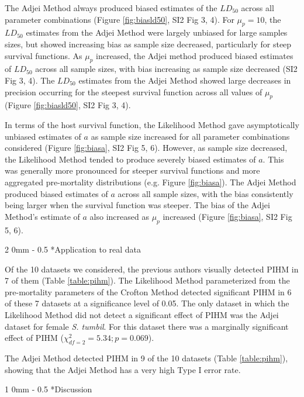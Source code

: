 \documentclass[12pt, a4paper]{article}
\makeatletter
\renewcommand{\section}{\@startsection
{section}%
{1}%
{0mm}%
{-\baselineskip}%
{0.5\baselineskip}%
{\normalfont\bf\large}} %
\renewcommand{\subsection}{\@startsection
{subsection}%
{2}%
{0mm}%
{-\baselineskip}%
{0.5\baselineskip}%
{\normalfont\bf}} %
\makeatother
\begin{document}
The Adjei Method
always produced biased estimates of the $LD_{50}$ across all parameter combinations (Figure \ref{fig:biasld50}, SI2 Fig 3, 4).  For $\mu_p = 10$, the $LD_{50}$
estimates from the Adjei Method were largely unbiased for large samples sizes,
but showed increasing bias as sample size decreased, particularly for steep
survival functions.  As $\mu_p$ increased, the Adjei method
produced biased estimates of $LD_{50}$ across all sample sizes, with bias
increasing as sample size decreased (SI2 Fig 3, 4). The $LD_{50}$ estimates from the Adjei
Method showed large decreases in precision occurring
for the steepest survival function across all values of $\mu_p$ (Figure \ref{fig:biasld50}, SI2 Fig 3, 4).

In terms of the host survival function, the Likelihood Method gave
asymptotically unbiased estimates of $a$ as sample size increased for
all parameter combinations considered (Figure \ref{fig:biasa}, SI2 Fig 5, 6).  However, as sample size decreased, the
Likelihood Method tended to produce severely biased estimates of $a$.
This was generally more pronounced for steeper survival functions and more
aggregated pre-mortality distributions (e.g. Figure \ref{fig:biasa}).  The Adjei Method produced
biased estimates of $a$ across all sample sizes, with the bias
consistently being larger when the survival function was steeper. The bias of
the Adjei Method's estimate of $a$ also increased as $\mu_p$ increased (Figure \ref{fig:biasa}, SI2 Fig 5, 6).

\subsection*{Application to real data}

Of the 10 datasets we considered, the previous authors visually detected PIHM
in 7 of them (Table \ref{table:pihm}).  The Likelihood Method parameterized
from the pre-mortality parameters of the Crofton Method detected significant
PIHM in 6 of these 7 datasets at a significance level of 0.05.  The only
dataset in which the Likelihood Method did not detect a significant effect of PIHM was the Adjei dataset
for female \emph{S. tumbil}.  For this dataset there was a marginally significant effect
of PIHM ($\chi^2_{df=2} = 5.34; p = 0.069$).

The Adjei Method detected PIHM in 9 of the 10 datasets (Table \ref{table:pihm}),  showing that the Adjei Method has a very high Type I error rate.

\section*{Discussion}
\end{document}
